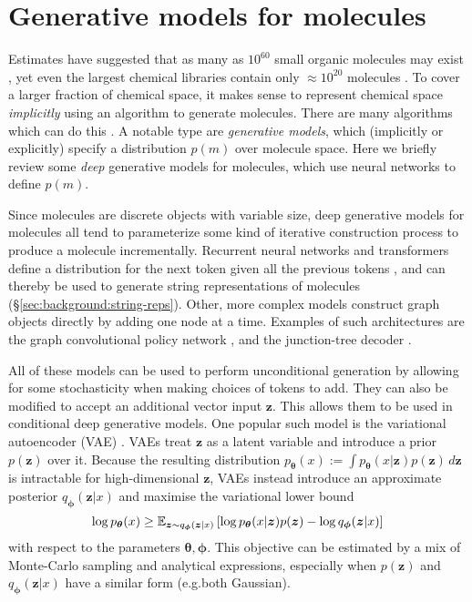 \section{Generative models for molecules}
\label{sec:background:molgen}

Estimates have suggested that as many as $10^{60}$ small organic molecules may exist
\citep{bohacek1996art},
yet even the largest chemical libraries contain only $\approx10^{20}$ molecules
\citep{hoffmann2019next}.
To cover a larger fraction of chemical space, it makes sense to represent chemical space \emph{implicitly}
using an algorithm to generate molecules.
There are many algorithms which can do this
\citep{xu2019deep,du2022molgensurvey}.
A notable type are \emph{generative models},
which (implicitly or explicitly) specify a distribution $p(m)$ over molecule space.
Here we briefly review some \emph{deep} generative models for molecules,
which use neural networks to define $p(m)$.

Since molecules are discrete objects with variable size,
deep generative models for molecules all tend to parameterize some
kind of iterative construction process to produce a molecule incrementally.
Recurrent neural networks and transformers define a distribution
for the next token given all the previous tokens
\citep{Goodfellow-et-al-2016deep-learning,turner2023introduction},
and can thereby be used to generate string representations of molecules
(\S\ref{sec:background:string-reps}).
Other, more complex models construct graph objects directly by adding one node at a time.
Examples of such architectures are the graph convolutional policy network \citep{you_graph_2018},
and the junction-tree decoder \citep{jin_junction_2019}.

All of these models can be used to perform unconditional generation by allowing
for some stochasticity when making choices of tokens to add.
They can also be modified to accept an additional vector input $\bm{z}$.
This allows them to be used in conditional deep generative models.
One popular such model is the variational autoencoder (VAE) \citep{kingma2013auto}.
VAEs treat $\bm{z}$ as a latent variable and introduce a prior $p(\bm{z})$ over it.
Because the resulting distribution $p_{\bm{\theta}}(x):=\int p_{\bm{\theta}}(x|\bm{z})p(\bm{z})\,d\bm{z}$
is intractable for high-dimensional $\bm{z}$,
VAEs instead introduce an approximate posterior $q_{\bm{\phi}}(\bm{z}|x)$
and maximise the variational lower bound
\begin{equation}
    \log{p_{\bm{\theta}}(x)} \geq
    \mathbb{E}_{\bm{z}\sim q_{\bm{\phi}}(\bm{z}|x)} \left[
        \log{p_{\bm{\theta}}(x|\bm{z})p(\bm{z})}
        - \log{q_{\bm{\phi}}(\bm{z}|x)}
    \right]
\end{equation}
with respect to the parameters $\bm{\theta},\bm{\phi}$.
This objective can be estimated by a mix of Monte-Carlo sampling and analytical expressions,
especially when $p(\bm{z})$ and $q_{\bm{\phi}}(\bm{z}|x)$ have a similar form (e.g.\@ both Gaussian).

